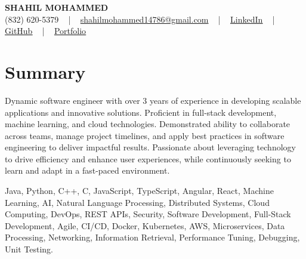 \documentclass[letterpaper,10pt]{article}
\begin{document}
\begin{center}
    {\fontsize{14pt}{12pt}\selectfont \textbf{\MakeUppercase{Shahil Mohammed}}}\\ \vspace{2pt}
    \fontsize{10pt}{12pt}\selectfont (832) 620-5379 ~ | ~ \href{mailto:shahilmohammed14786@gmail.com}{shahilmohammed14786@gmail.com} ~ | ~  
    \href{https://www.linkedin.com/in/shahil-mohammed-9652931a1/}{\color{blue}\underline{LinkedIn}}  ~ | ~ 
    \href{https://github.com/freakbeast14}{\color{blue}\underline{GitHub}} ~ | ~ 
    \href{https://shahil-mohammed.netlify.app/}{\color{blue}\underline{Portfolio}}
    \vspace{-8pt}
\end{center}

\section{Summary}
\vspace{-2pt}\fontsize{8pt}{9pt}\selectfont
Dynamic software engineer with over 3 years of experience in developing scalable applications and innovative solutions. Proficient in full-stack development, machine learning, and cloud technologies. Demonstrated ability to collaborate across teams, manage project timelines, and apply best practices in software engineering to deliver impactful results. Passionate about leveraging technology to drive efficiency and enhance user experiences, while continuously seeking to learn and adapt in a fast-paced environment.
 \vspace{-5pt}
 
{\fontsize{1pt}{1pt}\selectfont\color{white}
Java, Python, C++, C, JavaScript, TypeScript, Angular, React, Machine Learning, AI, Natural Language Processing, Distributed Systems, Cloud Computing, DevOps, REST APIs, Security, Software Development, Full-Stack Development, Agile, CI/CD, Docker, Kubernetes, AWS, Microservices, Data Processing, Networking, Information Retrieval, Performance Tuning, Debugging, Unit Testing.
}
\vspace{-8pt}

\vspace{-2pt}
\end{document}
